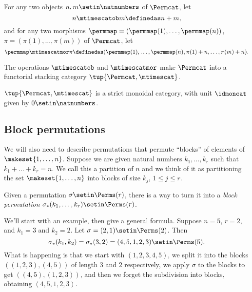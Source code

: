 \begin{definition}\label{def:Permcat-1}
    For any two objects $n, m \setin\natnumbers$ of $\Permcat$, let
    \begin{equation}
        n \mtimescatob m \definedas n + m,
    \end{equation}
    and for any two morphisms $\permmap = (\permmap(1), \dots, \permmap(n))$, $\pi = (\pi(1), \dots, \pi(m))$ of $\Permcat$, let
    \begin{equation}
        \permmap \mtimescatmor \pi \definedas (\permmap(1), \dots, \permmap(n), \pi(1) + n, \dots, \pi(m) + n).
    \end{equation}
\end{definition}

\begin{lemma}
    The operations $\mtimescatob$ and $\mtimescatmor$ make $\Permcat$ into a functorial stacking category $\tup{\Permcat, \mtimescat}$.
\end{lemma}


\begin{lemma}
    $\tup{\Permcat, \mtimescat}$ is a strict monoidal category, with unit $\idmoncat$ given by $0 \setin \natnumbers$.
\end{lemma}


\subsection{Block permutations}

We will also need to describe permutations that permute ``blocks'' of elements of $\makeset{1, \dots, n}$.
Suppose we are given natural numbers $k_1, \dots, k_r$ such that $k_1 + \dots + k_r = n$.
We call this a partition of $n$ and we think of it as partitioning the set $\makeset{1, \dots, n}$ into blocks of size $k_j$, $1 \leq j \leq r$.

Given a permutation $\sigma \setin \Perms(r)$, there is a way to turn it into a \emph{block permutation} $\sigma_*(k_1, \dots, k_r) \setin\Perms(r)$.

We'll start with an example, then give a general formula.
Suppose $n = 5$, $r=2$, and $k_1 = 3$ and $k_2 = 2$.
Let $\sigma = (2, 1) \setin \Perms(2)$.
Then
$$
    \sigma_*(k_1, k_2) = \sigma_*(3,2) = (4,5,1,2,3) \setin \Perms(5).
$$
What is happening is that we start with $(1,2,3,4,5)$, we split it into the blocks $((1,2,3),(4,5))$ of length $3$ and $2$ respectively, we apply $\sigma$ to the blocks to get $((4,5),(1,2,3))$, and then we forget the subdivision into blocks, obtaining $(4,5,1,2,3)$.


